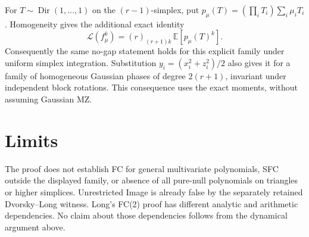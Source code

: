 \documentclass[11pt]{article}
\newcommand{\Lfac}{\mathcal L}
\begin{document}
For $T\sim\operatorname{Dir}(1,\ldots,1)$ on the $(r-1)$-simplex, put
$p_\mu(T)=(\prod_iT_i)\sum_i\mu_iT_i$. Homogeneity gives the additional
exact identity
\[
 \Lfac(f_\mu^k)=(r)_{(r+1)k}\,\mathbb E[p_\mu(T)^k].          \tag{2}
\]
Consequently the same no-gap statement holds for this explicit family
under uniform simplex integration. Substitution
$y_i=(x_i^2+z_i^2)/2$ also gives it for a family of homogeneous Gaussian
phases of degree $2(r+1)$, invariant under independent block rotations.
This consequence uses the exact moments, without assuming Gaussian MZ.

\section*{Limits}
The proof does not establish FC for general multivariate polynomials,
SFC outside the displayed family, or absence of all pure-null polynomials
on triangles or higher simplices. Unrestricted Image is already false
by the separately retained Dvorsky--Long witness. Long's FC(2) proof has
different analytic and arithmetic dependencies. No claim about those
dependencies follows from the dynamical argument above.
\end{document}
